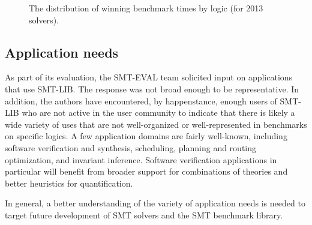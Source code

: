 \documentclass{eptcs}
\begin{document}
\begin{figure}
\centering
\begin{tabular}{|l|r|rrrr|}
\hline

\hline
\end{tabular}
\caption{The distribution of winning benchmark times by logic (for 2013 solvers).}
\label{Fig:quintiles}
\end{figure}

\subsection{Application needs}
\label{Applications}

As part of its evaluation, the SMT-EVAL team solicited input on applications that use SMT-LIB. The response was not broad enough to be representative. In addition, the authors 
have encountered, by happenstance, enough users of SMT-LIB who are not active in the user community to indicate that there is likely a wide variety of uses that are not well-organized or well-represented in benchmarks on specific logics. A few application domains are fairly well-known, including software verification and synthesis, scheduling, planning and routing optimization, and invariant inference. Software verification applications in particular will benefit from broader support for combinations of theories and better heuristics for quantification. 

In general, a better understanding of the variety of application needs is needed to target future development of SMT solvers and the SMT benchmark library.

%
%
%
\end{document}
